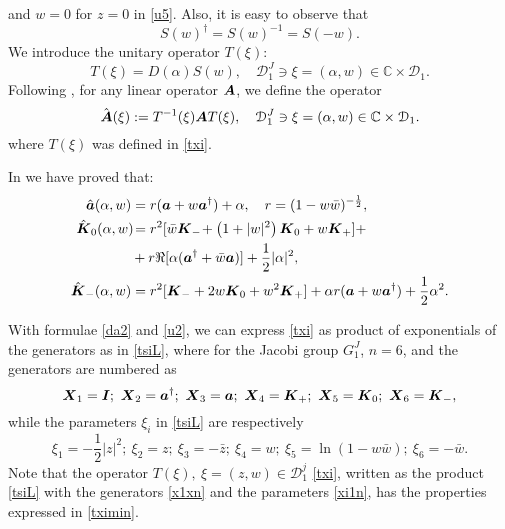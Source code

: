 \documentclass[12pt]{amsart}
\numberwithin{equation}{section}
\theoremstyle{definition}
\begin{document}
and  $w=0$ for $z=0$ in \eqref{u5}.  
Also, it is easy to observe that
$$S(w)^{\dagger}=S(w)^{-1}= S(-w).$$
We  introduce the unitary operator $T(\xi)$:
\begin{equation}\label{txi}
T(\xi)=D(\alpha)S(w), \quad{{\mathcal{{D}}}}^J_1\ni\xi=(\alpha,w)\in{\ensuremath{\mathbb{C}}}\times{{\mathcal{{D}}}}_1.
\end{equation}
Following \cite{sbcg,sb12,sb13}, for any linear operator ${{\mbox{\boldmath{${A}$}}}}$, 
 we  define the operator
\begin{equation}\label{OpAhat}
\hat{{{\mbox{\boldmath{${A}$}}}}}(\xi):=T^{-1}(\xi) {{\mbox{\boldmath{${A}$}}}}T(\xi), \quad{{\mathcal{{D}}}}^J_1 \ni\xi=(\alpha,w)\in{\ensuremath{\mathbb{C}}}\times{{\mathcal{{D}}}}_1.
\end{equation}
where $T(\xi)$ was defined in \eqref{txi}. 

In  \cite{sb12,sb13}  we have proved that:
\begin{align}\label{kl1}
\hat{{{\mbox{\boldmath{${a}$}}}}}(\alpha,w) & =r (  {{\mbox{\boldmath{${a}$}}}}+w{{\mbox{\boldmath{${a}$}}}}^{\dagger})
+\alpha , \quad r=(1-w\bar{w})^{-\frac{1}{2}}, \\
 \hat{{{\mbox{\boldmath{${K}$}}}}}_{0}(\alpha,w)\! & = r^2[ 
 \bar{w}{{\mbox{\boldmath{${K}$}}}}_{-}\!+\left(  1+|w|^2\right)  {{\mbox{\boldmath{${K}$}}}}_{0}+w{{\mbox{\boldmath{${K}$}}}}_{+}] + \\
 \nonumber & + r \Re[\alpha(
  {{\mbox{\boldmath{${a}$}}}}^{\dagger}+\bar{w}{{\mbox{\boldmath{${a}$}}}})] +\frac{1}{2}|\alpha|^2,\\ 
\label{kl2}
\hat{{{\mbox{\boldmath{${K}$}}}}}_{-}(\alpha,w) & =  r^2[  {{\mbox{\boldmath{${K}$}}}}_{-}+2w{{\mbox{\boldmath{${K}$}}}}_{0}+w^{2}{{\mbox{\boldmath{${K}$}}}}_{+}] + \alpha r ({{\mbox{\boldmath{${a}$}}}}+w{{\mbox{\boldmath{${a}$}}}}^{\dagger}) +\frac{1}{2}\alpha^2.
\end{align}

With formulae \eqref{da2} and \eqref{u2}, we can express \eqref{txi}
as product of exponentials of the generators
as in \eqref{tsiL}, 
where for the Jacobi group $G^J_1$, $n=6$, and the generators
are numbered as 
\begin{equation}\label{x1xn}
{{\mbox{\boldmath{${X}$}}}}_1={{\mbox{\boldmath{${I}$}}}}; ~{{\mbox{\boldmath{${X}$}}}}_2={{\mbox{\boldmath{${a}$}}}}^{\dagger};~{{\mbox{\boldmath{${X}$}}}}_3={{\mbox{\boldmath{${a}$}}}};~ {{\mbox{\boldmath{${X}$}}}}_4={{\mbox{\boldmath{${K}$}}}}_+;~
{{\mbox{\boldmath{${X}$}}}}_5={{\mbox{\boldmath{${K}$}}}}_0;~{{\mbox{\boldmath{${X}$}}}}_6={{\mbox{\boldmath{${K}$}}}}_-,
\end{equation}
while the parameters $\xi_i$  in \eqref{tsiL} are respectively
\begin{equation}\label{xi1n}
\xi_1=-\frac{1}{2}|z|^2;  ~\xi_2=  z;~\xi_3= -\bar{z};  ~\xi_4= w;  ~\xi_5=\ln(1-w\bar{w}) ;  ~\xi_6= -\bar{w} .
\end{equation}
Note that the operator  $T(\xi), ~ \xi=(z,w)\in{{\mathcal{{D}}}}^j_1$ \eqref{txi}, written as the product \eqref{tsiL} with the generators \eqref{x1xn} and the parameters  \eqref{xi1n},
has the properties expressed in \eqref{tximin}. 
\end{document}
